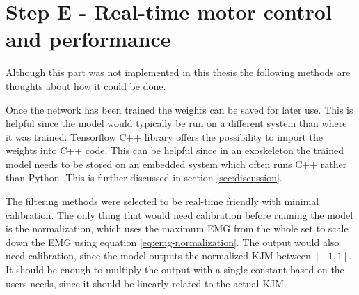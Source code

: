 \documentclass[../main.tex]{subfiles}
\begin{document}
\section{Step E - Real-time motor control and performance}
Although this part was not implemented in this thesis the following methods are thoughts about how it could be done.

Once the network has been trained the weights can be saved for later use.
This is helpful since the model would typically be run on a different system than where it was trained.
Tensorflow C++ library offers the possibility to import the weights into C++ code.
This can be helpful since in an exoskeleton the trained model needs to be stored on an embedded system which often runs C++ rather than Python.
This is further discussed in section \ref{sec:discussion}.

The filtering methods were selected to be real-time friendly with minimal calibration.
The only thing that would need calibration before running the model is the normalization, which uses the maximum \ac{EMG} from the whole set to scale down the \ac{EMG} using equation \ref{eq:emg-normalization}.
The output would also need calibration, since the model outputs the normalized \ac{KJM} between $\left[-1,1\right]$.
It should be enough to multiply the output with a single constant based on the users needs, since it should be linearly related to the actual \ac{KJM}.
\end{document}
